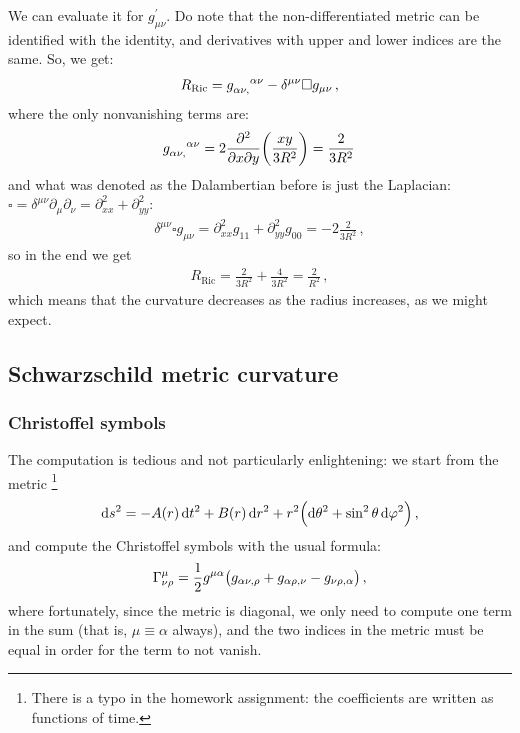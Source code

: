 \documentclass[main.tex]{subfiles}
\begin{document}
We can evaluate it for \(g_{\mu \nu }^{\prime }\). Do note  that the non-differentiated metric can be identified with the identity, and derivatives with upper and lower indices are the same. So, we get:
%
\begin{align}
  R _{\text{Ric}} = \tensor{g}{_{\alpha \nu , }^{\alpha \nu }} - \delta^{\mu \nu } \square g_{\mu \nu }
\,,
\end{align}
%
where the only nonvanishing terms are: 
%
\begin{align}
  \tensor{g}{_{\alpha \nu,}^{\alpha \nu }} = 2 \pdv[2]{}{x}{y} \qty(\frac{xy}{3R^2}) = \frac{2}{3R^2}
\,
\end{align}
%
and what was denoted as the Dalambertian before is just the Laplacian: \(\square = \delta^{\mu \nu }\partial_{\mu } \partial_{\nu }= \partial^2_{xx} + \partial^2_{yy}\):
%
\begin{align}
  \delta^{\mu \nu } \square g_{\mu \nu }
  = \partial_{xx}^2 g_{11} + \partial_{yy}^2 g_{00}
  = - 2 \frac{2}{3R^2} 
\,,
\end{align}
%
so in the end we get 
%
\begin{align}
  R _{\text{Ric}} = \frac{2}{3R^2} + \frac{4}{3R^2} = \frac{2}{R^2}
\,,
\end{align}
%
which means that the curvature decreases as the radius increases, as we might expect.

\subsection{Schwarzschild metric curvature}

\subsubsection{Christoffel symbols}

The computation is tedious and not particularly enlightening: we start from the metric
\footnote{There is a typo in the homework assignment: the coefficients are written as functions of time.}
%
\begin{align}
  \dd{s^2} = - A(r) \dd{t^2}
  + B(r) \dd{r^2}
  + r^2 \qty(\dd{\theta^2} + \sin^2\theta \dd{\varphi^2})
\,,
\end{align}
%
and compute the Christoffel symbols with the usual formula: 
%
\begin{align}
  \Gamma^{\mu }_{\nu \rho } =
  \frac{1}{2} g^{\mu \alpha }\qty(g_{\alpha \nu , \rho }
  + g_{\alpha \rho, \nu } - g_{\nu \rho , \alpha })
\,,
\end{align}
%
where fortunately, since the metric is diagonal, we only need to compute one term in the sum (that is, \(\mu \equiv \alpha \) always), and the two indices in the metric must be equal in order for the term to not vanish. 
\end{document}
